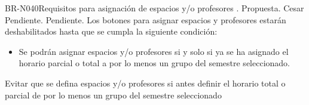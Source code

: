 \begin{BusinessRule}{BR-N040}{Requisitos para asignación de espacios y/o profesores}
	{\bcCondition}    %
	{\btEnabler}     %
	{\blControlling}    %
	.
	\BRItem[Estado] Propuesta.
	 Cesar
	 Pendiente.
	 Pendiente.
	\BRItem[Descripción] Los botones para asignar espacios y profesores estarán deshabilitados hasta que se cumpla la siguiente condición:\\
		\begin{itemize}
			\item Se podrán asignar espacios y/o profesores si y solo si ya se ha asignado el horario parcial o total a por lo menos un grupo del semestre seleccionado.
		\end{itemize}
	\BRItem[Motivación] Evitar que se defina espacios y/o profesores si antes definir el horario total o parcial de por lo menos un grupo del semestre seleccionado
\end{BusinessRule}

